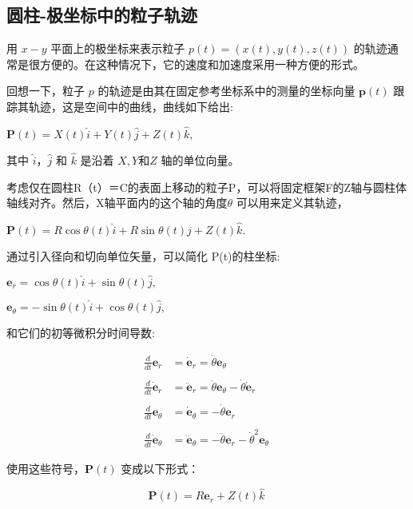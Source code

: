 \subsection{圆柱-极坐标中的粒子轨迹}

用 $x-y$ 平面上的极坐标来表示粒子 $p(t) = (x(t), y(t), z(t))$ 的轨迹通常是很方便的。在这种情况下，它的速度和加速度采用一种方便的形式。

回想一下，粒子 $p$ 的轨迹是由其在固定参考坐标系中的测量的坐标向量 $\mathbf{p}(t)$ 跟踪其轨迹，这是空间中的曲线，曲线如下给出:

$\mathbf{P}(t) = X(t)\hat{i} + Y(t)\hat{j} + Z(t)\hat{k},$

其中 $\hat{i}$，$\hat{j}$ 和 $\hat{k}$ 是沿着 $X, Y \text{和} Z$ 轴的单位向量。

考虑仅在圆柱R（t）＝C的表面上移动的粒子P，可以将固定框架F的Z轴与圆柱体轴线对齐。然后，X轴平面内的这个轴的角度$\theta$ 可以用来定义其轨迹，

$\mathbf{P}(t) = R \cos \theta(t) \hat{i} + R \sin \theta(t) \hat{j} + Z(t) \hat{k}.$

通过引入径向和切向单位矢量，可以简化 P(t)的柱坐标:

$\mathbf{e}_r = \cos \theta(t) \hat{i} + \sin \theta(t) \hat{j},$


$\mathbf{e}_{\theta} = -\sin \theta(t) \hat{i} + \cos \theta(t) \hat{j},$

和它们的初等微积分时间导数:

\begin{align}
\frac{d}{dt}\mathbf{e}_r &= \dot{\mathbf{e}}_r = \dot{\theta} \mathbf{e}_\theta \\\\
\frac{d}{dt}\dot{\mathbf{e}}_r &=  \ddot{\mathbf{e}}_r = \ddot{\theta} \mathbf{e}_\theta - \dot{\theta} \dot{\mathbf{e}}_r \\\\
\frac{d}{dt}\mathbf{e}_\theta &= \dot{\mathbf{e}}_\theta =  -\dot{\theta} \mathbf{e}_r \\\\
\frac{d}{dt}\dot{\mathbf{e}}_\theta &= \ddot{\mathbf{e}}_\theta = -\ddot{\theta} \mathbf{e}_r - \dot{\theta}^2 \mathbf{e}_\theta ~
\end{align}

使用这些符号，$\mathbf{P}(t)$ 变成以下形式：

\begin{equation}
\mathbf{P}(t) = R\mathbf{e}_r + Z(t)\hat{k}~
\end{equation}

